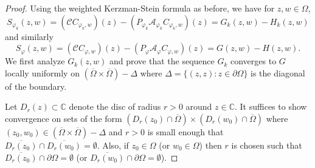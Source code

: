 \documentclass[11pt, reqno]{amsart}
\numberwithin{equation}{section}
\newcommand{\mbb}{\mathbb}
\begin{document}
\begin{proof}
Using the weighted Kerzman-Stein formula as before, we have for $z,w\in\Omega$,
\[
S_{\varphi_k}(z,w)
=
(\mathcal{C} C_{\varphi_k,w})(z) - (P_{\varphi_k} \mathcal{A}_{\varphi_k} C_{\varphi_k,w})(z)
=
G_{k}(z,w)-H_k(z,w)
\]
and similarly
\[
S_{\varphi}(z,w)
=
(\mathcal{C} C_{\varphi,w})(z) - (P_{\varphi} \mathcal{A}_{\varphi} C_{\varphi,w})(z)
=
G(z,w)-H(z,w).
\]
We first analyze $G_k(z,w)$ and prove that the sequence $G_k$ converges to $G$ locally uniformly on $(\overline{\Omega}\times\overline{\Omega})-\Delta$ where $\Delta=\{(z,z) : z\in\partial\Omega\}$ is the diagonal of the boundary.

\medskip

Let $D_r(z) \subset \mbb C$ denote the disc of radius $r > 0$ around $z \in \mbb C$. It suffices to show convergence on sets of the form $(D_r(z_0)\cap \overline{\Omega})\times (D_r(w_0)\cap\overline{\Omega})$ where $(z_0,w_0)\in(\overline{\Omega}\times\overline{\Omega})-\Delta$ and $r>0$ is small enough that $\overline{D_r(z_0)}\cap \overline{D_r(w_0)}=\emptyset$. Also, if $z_0\in\Omega$ (or $w_0\in\Omega$) then $r$ is chosen such that $\overline{D_r(z_0)}\cap \partial\Omega=\emptyset$ (or $\overline{D_r(w_0)}\cap \partial\Omega=\emptyset$).

\medskip


\end{proof}
\end{document}
